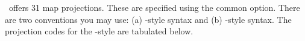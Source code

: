 \GMT\ offers 31 map projections.  These are specified using the  common option.
There are two conventions you may use: (a) \GMT-style syntax and (b) -style
syntax.
The projection codes for the \GMT-style are tabulated below.
\newenvironment{cmdlineopts}[1]{
\newcommand{\lon}[1]{$lon_{##1}$}
\newcommand{\lat}[1]{$lat_{##1}$}
\newcommand{\Wi}{\emph{width}}
\newcommand{\wi}{\emph{scale}}
\newcommand{\ho}{[/\emph{horizon}]}
\newcommand{~}{\hspace{0.2in}}

\begin{tabular}{|ll|}
\multicolumn{2}{c}\textbf{#1} \\ \hline
\Opt{J}	(upper case for \Wi, lower case for \wi) &	Map projection \\ \hline
}{
\end{tabular}
}

